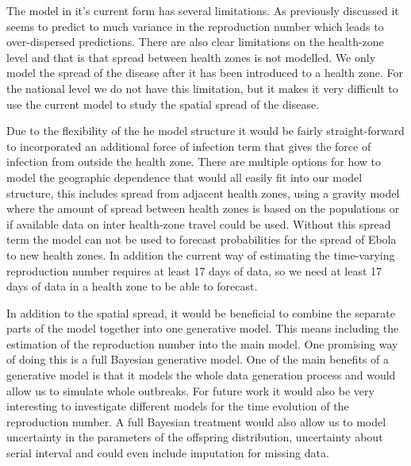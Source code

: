 \documentclass[12pt]{article}
\begin{document}
The model in it's current form has several limitations. As previously discussed it seems to predict to much variance in the reproduction number which leads to over-dispersed predictions. There are also clear limitations on the health-zone level and that is that spread between health zones is not modelled. We only model the spread of the disease after it has been introduced to a health zone. For the national level we do not have this limitation, but it makes it very difficult to use the current model to study the spatial spread of the disease. 

Due to the flexibility of the he model structure it would be fairly straight-forward to incorporated an additional force of infection term that gives the force of infection from outside the health zone. There are multiple options for how to model the geographic dependence that would all easily fit into our model structure, this includes spread from adjacent health zones, using a gravity model where the amount of spread between health zones is based on the populations or if available data on inter health-zone travel could be used. Without this spread term the model can not be used to forecast probabilities for the spread of Ebola to new health zones. In addition the current way of estimating the time-varying reproduction number requires at least 17 days of data, so we need at least 17 days of data in a health zone to be able to forecast.

In addition to the spatial spread, it would be beneficial to combine the separate parts of the model together into one generative model. This means including the estimation of the reproduction number into the main model. One promising way of doing this is a full Bayesian generative model. One of the main benefits of a generative model is that it models the whole data generation process and would allow us to simulate whole outbreaks. For future work it would also be very interesting to investigate different models for the time evolution of the reproduction number. A full Bayesian treatment would also allow us to model uncertainty in the parameters of the offspring distribution, uncertainty about serial interval and could even include imputation for missing data. 
\end{document}
